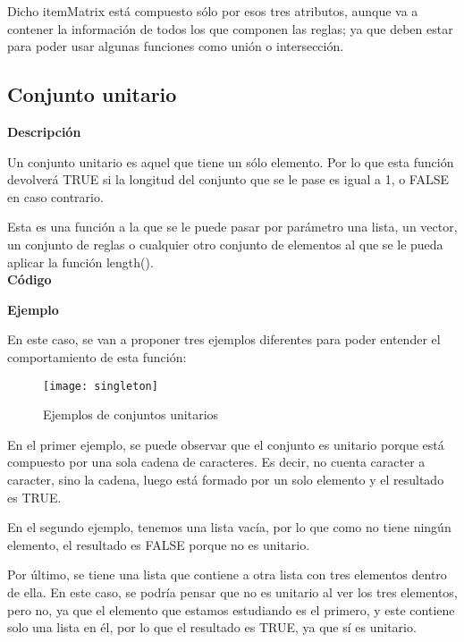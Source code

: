     Dicho itemMatrix est\'a compuesto s\'olo por esos tres atributos, aunque va a contener la informaci\'on de todos los que 
    componen las reglas; ya que deben estar para poder usar algunas funciones como uni\'on o intersecci\'on.



\subsection{Conjunto unitario}

    \textbf{Descripci\'on}
    
    Un conjunto unitario es aquel que tiene un s\'olo elemento. Por lo que esta funci\'on 
    devolver\'a TRUE si la longitud del conjunto que se le pase es igual a 1, o FALSE en caso 
    contrario.

    Esta es una funci\'on a la que se le puede pasar por par\'ametro una lista, un vector, 
    un conjunto de reglas o cualquier otro conjunto de elementos al que se le pueda aplicar la funci\'on 
    length().
    \\


    \textbf{C\'odigo}

    
    \bigskip

    \textbf{Ejemplo}

    En este caso, se van a proponer tres ejemplos diferentes para poder entender el comportamiento de esta funci\'on:

    \begin{figure}[H]
        \centering
        \texttt{[image: singleton]}
        \caption{Ejemplos de conjuntos unitarios}
        \label{fig:singleton}
    \end{figure}

    En el primer ejemplo, se puede observar que el conjunto es unitario porque est\'a compuesto por una sola cadena de caracteres. 
    Es decir, no cuenta caracter a caracter, sino la cadena, luego est\'a formado por un solo elemento y el resultado es TRUE.

    En el segundo ejemplo, tenemos una lista vac\'ia, por lo que como no tiene ning\'un elemento, el resultado es FALSE porque no es unitario.

    Por \'ultimo, se tiene una lista que contiene a otra lista con tres elementos dentro de ella. En este caso, se podr\'ia pensar que 
    no es unitario al ver los tres elementos, pero no, ya que el elemento que estamos estudiando es el primero, y este contiene solo una lista 
    en \'el, por lo que el resultado es TRUE, ya que s\'i es unitario.



